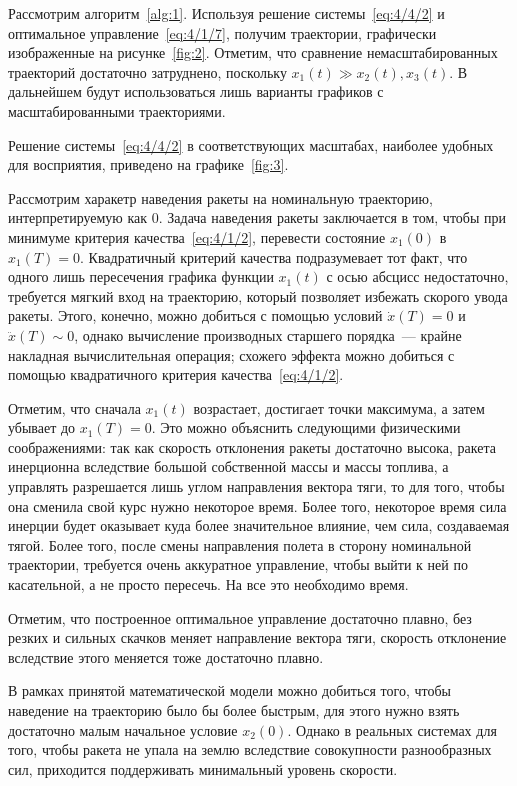 Рассмотрим алгоритм~\vref{alg:1}. Используя решение системы~\ref{eq:4/4/2} и оптимальное управление~\ref{eq:4/1/7}, получим траектории, графически изображенные на рисунке~\ref{fig:2}. Отметим, что сравнение немасштабированных траекторий достаточно затруднено, поскольку $x_1(t) \gg x_2(t), x_3(t)$. В дальнейшем будут использоваться лишь варианты графиков с масштабированными траекториями.


Решение системы~\ref{eq:4/4/2} в соответствующих масштабах, наиболее удобных для восприятия, приведено на графике~\ref{fig:3}.

\br

Рассмотрим харакетр наведения ракеты на номинальную траекторию, интерпретируемую как $0$. Задача наведения ракеты заключается в том, чтобы при минимуме критерия качества~\ref{eq:4/1/2}, перевести состояние $x_1(0)$ в $x_1(T)=0$. Квадратичный критерий качества подразумевает тот факт, что одного лишь пересечения графика функции $x_1(t)$ с осью абсцисс недостаточно, требуется мягкий вход на траекторию, который позволяет избежать скорого увода ракеты. Этого, конечно, можно добиться с помощью условий $\dot{x}(T)=0$ и $\ddot{x}(T) \sim 0$, однако вычисление производных старшего порядка~--- крайне накладная вычислительная операция; схожего эффекта\cite{XU} можно добиться с помощью квадратичного критерия качества~\ref{eq:4/1/2}.

Отметим, что сначала $x_1(t)$ возрастает, достигает точки максимума, а затем убывает до $x_1(T)=0$. Это можно объяснить следующими физическими соображениями: так как скорость отклонения ракеты достаточно высока, ракета инерционна вследствие большой собственной массы и массы топлива, а управлять разрешается лишь углом направления вектора тяги, то для того, чтобы она сменила свой курс нужно некоторое время. Более того, некоторое время сила инерции будет оказывает куда более значительное влияние, чем сила, создаваемая тягой. Более того, после смены направления полета в сторону номинальной траектории, требуется очень аккуратное управление, чтобы выйти к ней по касательной, а не просто пересечь. На все это необходимо время.

Отметим, что построенное оптимальное управление достаточно плавно, без резких и сильных скачков меняет направление вектора тяги, скорость отклонение вследствие этого меняется тоже достаточно плавно.

В рамках принятой математической модели можно добиться того, чтобы наведение на траекторию было бы более быстрым, для этого нужно взять достаточно малым начальное условие $x_2(0)$. Однако в реальных системах для того, чтобы ракета не упала на землю вследствие совокупности разнообразных сил, приходится поддерживать минимальный уровень скорости.

